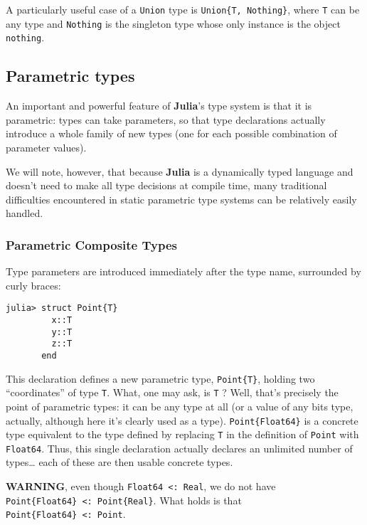 \documentclass[
]{article}
\begin{document}
A particularly useful case of a \texttt{Union} type is
\texttt{Union\{T,\ Nothing\}}, where \texttt{T} can be any type and
\texttt{Nothing} is the singleton type whose only instance is the object
\texttt{nothing}.

\hypertarget{parametric-types}{%
\subsection{Parametric types}\label{parametric-types}}

An important and powerful feature of \textbf{Julia}'s type system is
that it is parametric: types can take parameters, so that type
declarations actually introduce a whole family of new types (one for
each possible combination of parameter values).

We will note, however, that because \textbf{Julia} is a dynamically
typed language and doesn't need to make all type decisions at compile
time, many traditional difficulties encountered in static parametric
type systems can be relatively easily handled.

\hypertarget{parametric-composite-types}{%
\subsubsection{Parametric Composite
Types}\label{parametric-composite-types}}

Type parameters are introduced immediately after the type name,
surrounded by curly braces:

\begin{verbatim}
julia> struct Point{T}
         x::T
         y::T
         z::T
       end
\end{verbatim}

This declaration defines a new parametric type, \texttt{Point\{T\}},
holding two ``coordinates'' of type \texttt{T}. What, one may ask, is
\texttt{T} ? Well, that's precisely the point of parametric types: it
can be any type at all (or a value of any bits type, actually, although
here it's clearly used as a type). \texttt{Point\{Float64\}} is a
concrete type equivalent to the type defined by replacing \texttt{T} in
the definition of \texttt{Point} with \texttt{Float64}. Thus, this
single declaration actually declares an unlimited number of
types\ldots{} each of these are then usable concrete types.

\textbf{WARNING}, even though \texttt{Float64\ \textless{}:\ Real}, we
do not have \texttt{Point\{Float64\}\ \textless{}:\ Point\{Real\}}. What
holds is that \texttt{Point\{Float64\}\ \textless{}:\ Point}.
\end{document}
